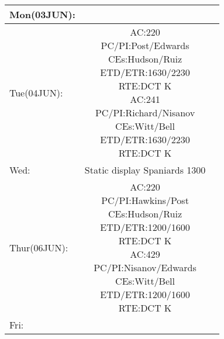 \documentclass[11pt, oneside]{article}   	%
\begin{document}
{\quad    

\begin{tabular}{|l|c|r}
Mon(03JUN): \\ \hline
Tue(04JUN):&\makecell{AC:220\\PC/PI:Post/Edwards\\CEs:Hudson/Ruiz\\ETD/ETR:1630/2230\\ RTE:DCT K \\ \hline
AC:241\\PC/PI:Richard/Nisanov\\CEs:Witt/Bell\\ETD/ETR:1630/2230 \\ RTE:DCT K}\\ \hline
Wed:& Static display Spaniards 1300\\ \hline
Thur(06JUN):&\makecell{AC:220\\PC/PI:Hawkins/Post\\CEs:Hudson/Ruiz\\ETD/ETR:1200/1600\\ RTE:DCT K \\ \hline
AC:429\\PC/PI:Nisanov/Edwards\\CEs:Witt/Bell\\ETD/ETR:1200/1600\\ RTE:DCT K} \\\hline
Fri:&\\ \hline

\end{tabular}

}
\end{document}
